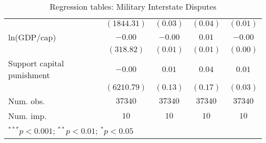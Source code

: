 \begin{table}
\begin{center}
\begin{tabular}{l c c c c}
                           & $(1844.31)$   & $(0.03)$     & $(0.04)$     & $(0.01)$ \\
ln(GDP/cap)                & $-0.00$       & $-0.00$      & $0.01$       & $-0.00$  \\
                           & $(318.82)$    & $(0.01)$     & $(0.01)$     & $(0.00)$ \\
Support capital punishment & $-0.00$       & $0.01$       & $0.04$       & $0.01$   \\
                           & $(6210.79)$   & $(0.13)$     & $(0.17)$     & $(0.03)$ \\
\midrule
Num. obs.                  & $37340$       & $37340$      & $37340$      & $37340$  \\
Num. imp.                  & $10$          & $10$         & $10$         & $10$     \\
\bottomrule
\multicolumn{5}{l}{\scriptsize{$^{***}p<0.001$; $^{**}p<0.01$; $^{*}p<0.05$}}
\end{tabular}
\caption{Regression tables: Military Interstate Disputes}
\label{MIDReg}
\end{center}
\end{table}
